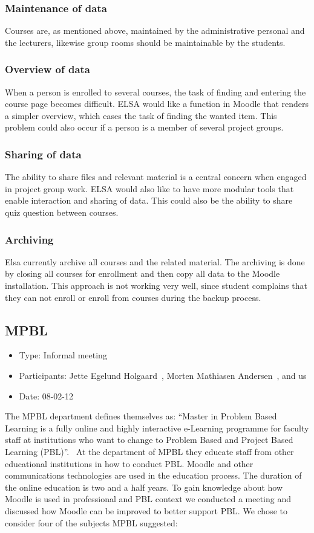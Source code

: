 \subsubsection{Maintenance of data} Courses are, as mentioned above, maintained by the administrative personal and the lecturers, likewise group rooms should be maintainable by the students.

\subsubsection{Overview of data} When a person is enrolled to several courses, the task of finding and entering the course page becomes difficult. 
ELSA would like a function in Moodle that renders a simpler overview, which eases the task of finding the wanted item.
This problem could also occur if a person is a member of several project groups.

\subsubsection{Sharing of data} The ability to share files and relevant material is a central concern when engaged in project group work. 
ELSA would also like to have more modular tools that enable interaction and sharing of data.
This could also be the ability to share quiz question between courses. 

\subsubsection{Archiving} Elsa currently archive all courses and the related material. 
The archiving is done by closing all courses for enrollment and then copy all data to the Moodle installation. 
This approach is not working very well, since student complains that they can not enroll or enroll from courses during the backup process. 

\subsection{MPBL}
\label{sub:mpblInterview}
\begin{itemize}
	\item Type: Informal meeting
	\item Participants: Jette Egelund Holgaard~\cite{jette}, Morten Mathiasen Andersen~\cite{morten}, and us
	\item Date: 08-02-12
\end{itemize}
The MPBL department defines themselves as:
``Master in Problem Based Learning is a fully online and highly interactive e-Learning programme for faculty staff at institutions who want to change to Problem Based and Project Based Learning (PBL)''.~\cite{mpbl}
At the department of MPBL they educate staff from other educational institutions in how to conduct PBL.
Moodle and other communications technologies are used in the education process. 
The duration of the online education is two and a half years.
To gain knowledge about how Moodle is used in professional and PBL context we conducted a meeting and discussed how Moodle can be improved to better support PBL. 
We chose to consider four of the subjects MPBL suggested:

